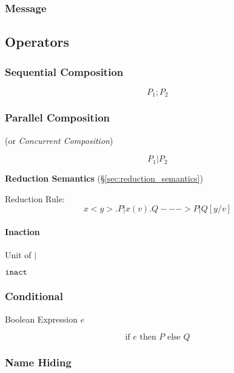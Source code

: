 \subsubsection{Message}\label{sec:message}



\subsection{Operators}\label{sec:process_operators}

\subsubsection{Sequential Composition}\label{sec:sequential_composition}

\[
  P_1; P_2
\]



\subsubsection{Parallel Composition}\label{sec:parallel_composition}

(or \emph{Concurrent Composition})

\[
  P_1 | P_2
\]


\textbf{Reduction Semantics} (\S\ref{sec:reduction_semantics})

Reduction Rule:
\[
  x<y>.P | x(v).Q ---> P | Q[y/v]
\]



\paragraph{Inaction}\label{sec:inaction}\hfill

Unit of $|$

$\mathtt{inact}$



\subsubsection{Conditional}\label{sec:conditional}

Boolean Expression $e$

\[
  \text{if } e \text{ then } P \text{ else } Q
\]



\subsubsection{Name Hiding}\label{sec:name_hiding}

